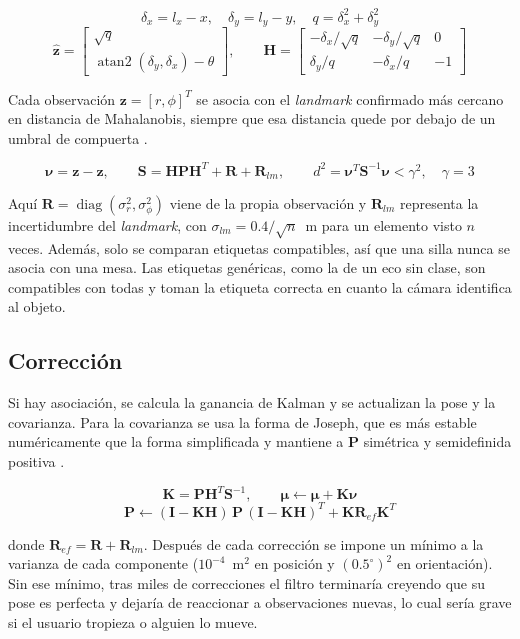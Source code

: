 \[
\delta_x = l_x - x,\quad \delta_y = l_y - y,\quad q = \delta_x^2 + \delta_y^2
\]
\[
\hat{\mathbf{z}} =
\begin{bmatrix} \sqrt{q} \\ \operatorname{atan2}(\delta_y, \delta_x) - \theta
\end{bmatrix},
\qquad
\mathbf{H} =
\begin{bmatrix}
-\delta_x/\sqrt{q} & -\delta_y/\sqrt{q} & 0 \\
\delta_y/q & -\delta_x/q & -1
\end{bmatrix}
\]

Cada observación $\mathbf{z} = [r, \phi]^T$ se asocia con el \emph{landmark} confirmado
más cercano en distancia de Mahalanobis, siempre que esa distancia quede por debajo de un
umbral de compuerta \cite{barshalom2001estimation, neira2001jcbb}.

\[
\boldsymbol{\nu} = \mathbf{z} - \hat{\mathbf{z}},
\qquad
\mathbf{S} = \mathbf{H}\mathbf{P}\mathbf{H}^T + \mathbf{R} + \mathbf{R}_{lm},
\qquad
d^2 = \boldsymbol{\nu}^T \mathbf{S}^{-1} \boldsymbol{\nu} < \gamma^2,\quad \gamma = 3
\]

Aquí $\mathbf{R} = \operatorname{diag}(\sigma_r^2, \sigma_\phi^2)$ viene de la propia
observación y $\mathbf{R}_{lm}$ representa la incertidumbre del \emph{landmark}, con
$\sigma_{lm} = 0.4/\sqrt{n}$~m para un elemento visto $n$ veces. Además, solo se comparan
etiquetas compatibles, así que una silla nunca se asocia con una mesa. Las etiquetas
genéricas, como la de un eco sin clase, son compatibles con todas y toman la etiqueta
correcta en cuanto la cámara identifica al objeto.

\subsection{Corrección}

Si hay asociación, se calcula la ganancia de Kalman y se actualizan la pose y la
covarianza. Para la covarianza se usa la forma de Joseph, que es más estable
numéricamente que la forma simplificada y mantiene a $\mathbf{P}$ simétrica y
semidefinida positiva \cite{grewal2015kalman}.

\[
\mathbf{K} = \mathbf{P}\mathbf{H}^T\mathbf{S}^{-1},
\qquad
\boldsymbol{\mu} \leftarrow \boldsymbol{\mu} + \mathbf{K}\boldsymbol{\nu}
\]
\[
\mathbf{P} \leftarrow (\mathbf{I} - \mathbf{K}\mathbf{H})\,\mathbf{P}\,
(\mathbf{I} - \mathbf{K}\mathbf{H})^T + \mathbf{K}\mathbf{R}_{ef}\mathbf{K}^T
\]

donde $\mathbf{R}_{ef} = \mathbf{R} + \mathbf{R}_{lm}$. Después de cada corrección se
impone un mínimo a la varianza de cada componente ($10^{-4}$~m$^2$ en posición y
$(0.5^\circ)^2$ en orientación). Sin ese mínimo, tras miles de correcciones el filtro
terminaría creyendo que su pose es perfecta y dejaría de reaccionar a observaciones
nuevas, lo cual sería grave si el usuario tropieza o alguien lo mueve.

